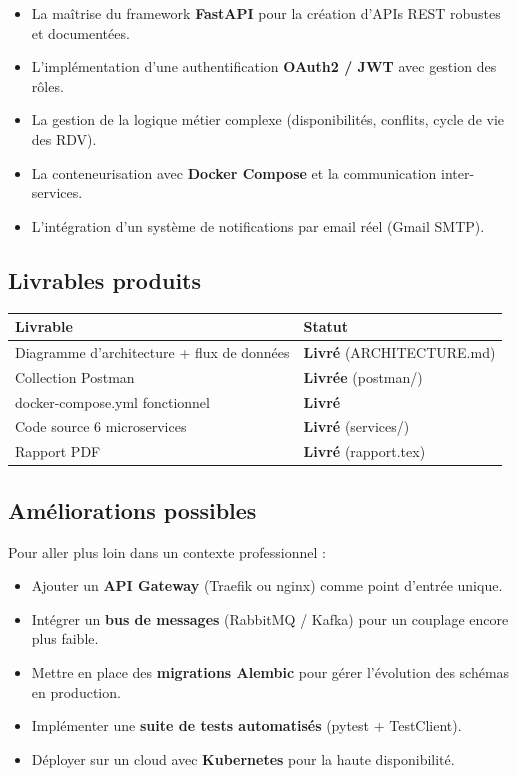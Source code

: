 \documentclass[12pt,a4paper]{article}
\begin{document}
\begin{itemize}
  \item La maîtrise du framework \textbf{FastAPI} pour la création d'APIs REST robustes et documentées.
  \item L'implémentation d'une authentification \textbf{OAuth2 / JWT} avec gestion des rôles.
  \item La gestion de la logique métier complexe (disponibilités, conflits, cycle de vie des RDV).
  \item La conteneurisation avec \textbf{Docker Compose} et la communication inter-services.
  \item L'intégration d'un système de notifications par email réel (Gmail SMTP).
\end{itemize}

\subsection{Livrables produits}

\begin{table}[H]
\centering
\begin{tabularx}{\textwidth}{L{5cm} X}
\toprule
\textbf{Livrable} & \textbf{Statut} \\
\midrule
Diagramme d'architecture + flux de données & \textcolor{greenok}{\textbf{Livré}} (ARCHITECTURE.md) \\
Collection Postman & \textcolor{greenok}{\textbf{Livrée}} (postman/) \\
docker-compose.yml fonctionnel & \textcolor{greenok}{\textbf{Livré}} \\
Code source 6 microservices & \textcolor{greenok}{\textbf{Livré}} (services/) \\
Rapport PDF & \textcolor{greenok}{\textbf{Livré}} (rapport.tex) \\
\bottomrule
\end{tabularx}
\end{table}

\subsection{Améliorations possibles}

Pour aller plus loin dans un contexte professionnel :
\begin{itemize}
  \item Ajouter un \textbf{API Gateway} (Traefik ou nginx) comme point d'entrée unique.
  \item Intégrer un \textbf{bus de messages} (RabbitMQ / Kafka) pour un couplage encore plus faible.
  \item Mettre en place des \textbf{migrations Alembic} pour gérer l'évolution des schémas en production.
  \item Implémenter une \textbf{suite de tests automatisés} (pytest + TestClient).
  \item Déployer sur un cloud avec \textbf{Kubernetes} pour la haute disponibilité.
\end{itemize}
\end{document}
